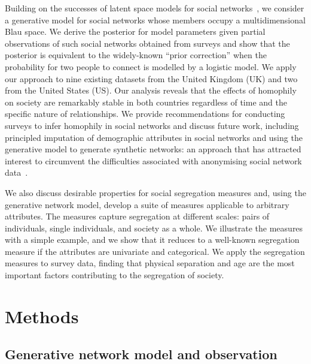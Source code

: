 \documentclass{scrartcl}
\begin{document}
Building on the successes of latent space models for social networks~\cite{Hoff2002,Handcock2007,Raftery2012}, we consider a generative model for social networks whose members occupy a multidimensional Blau space. We derive the posterior for model parameters given partial observations of such social networks obtained from surveys and show that the posterior is equivalent to the widely-known ``prior correction'' when the probability for two people to connect is modelled by a logistic model. We apply our approach to nine existing datasets from the United Kingdom (UK) and two from the United States (US). Our analysis reveals that the effects of homophily on society are remarkably stable in both countries regardless of time and the specific nature of relationships. We provide recommendations for conducting surveys to infer homophily in social networks and discuss future work, including principled imputation of demographic attributes in social networks and using the generative model to generate synthetic networks: an approach that has attracted interest to circumvent the difficulties associated with anonymising social network data~\cite{Pfeiffer-III2014, Lieberman2010, Lieberman2012, Nettleton2016, Sathanur2017}.

We also discuss desirable properties for social segregation measures and, using the generative network model, develop a suite of measures applicable to arbitrary attributes. The measures capture segregation at different scales: pairs of individuals, single individuals, and society as a whole. We illustrate the measures with a simple example, and we show that it reduces to a well-known segregation measure if the attributes are univariate and categorical. We apply the segregation measures to survey data, finding that physical separation and age are the most important factors contributing to the segregation of society.

\section{Methods}

\subsection{Generative network model and observation\label{sec:model}}
\end{document}
